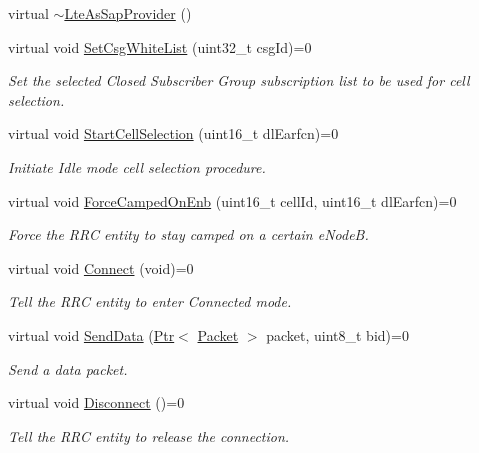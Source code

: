 \begin{DoxyCompactItemize}
\item 
virtual \hyperlink{classns3_1_1LteAsSapProvider_a98b7f112c817e6cb6962a69b7ce5512c}{$\sim$\+Lte\+As\+Sap\+Provider} ()
\item 
virtual void \hyperlink{classns3_1_1LteAsSapProvider_a349f8d7857a3efe84f4e7af0d0ff174d}{Set\+Csg\+White\+List} (uint32\+\_\+t csg\+Id)=0
\begin{DoxyCompactList}\small\item\em Set the selected Closed Subscriber Group subscription list to be used for cell selection. \end{DoxyCompactList}\item 
virtual void \hyperlink{classns3_1_1LteAsSapProvider_a6787cd42cbe5d66f9775eb8801209db6}{Start\+Cell\+Selection} (uint16\+\_\+t dl\+Earfcn)=0
\begin{DoxyCompactList}\small\item\em Initiate Idle mode cell selection procedure. \end{DoxyCompactList}\item 
virtual void \hyperlink{classns3_1_1LteAsSapProvider_ac9b1946e31e8ad613ed1c3c845d7af9b}{Force\+Camped\+On\+Enb} (uint16\+\_\+t cell\+Id, uint16\+\_\+t dl\+Earfcn)=0
\begin{DoxyCompactList}\small\item\em Force the R\+RC entity to stay camped on a certain e\+NodeB. \end{DoxyCompactList}\item 
virtual void \hyperlink{classns3_1_1LteAsSapProvider_aaaa9d78bc191b89ba8afa323baca67b0}{Connect} (void)=0
\begin{DoxyCompactList}\small\item\em Tell the R\+RC entity to enter Connected mode. \end{DoxyCompactList}\item 
virtual void \hyperlink{classns3_1_1LteAsSapProvider_a8480ab246d64feb077090923c62fa712}{Send\+Data} (\hyperlink{classns3_1_1Ptr}{Ptr}$<$ \hyperlink{classns3_1_1Packet}{Packet} $>$ packet, uint8\+\_\+t bid)=0
\begin{DoxyCompactList}\small\item\em Send a data packet. \end{DoxyCompactList}\item 
virtual void \hyperlink{classns3_1_1LteAsSapProvider_a5da1040c26a6f65d96b6738aa8154968}{Disconnect} ()=0
\begin{DoxyCompactList}\small\item\em Tell the R\+RC entity to release the connection. \end{DoxyCompactList}\item 

\end{DoxyCompactItemize}
